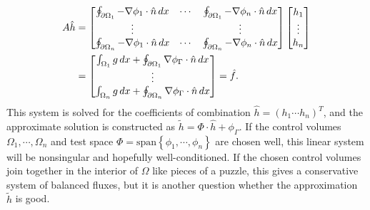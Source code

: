 \newcommand{\integralentry}[2]{\oint_{\pom_{#1}}-\nabla\phi_{#2}\cdot\hat{n}\,dx}
\newcommand{\integralrhsentry}[1]{\int_{\om_{#1}}g\,dx + \oint_{\pom_{#1}}\nabla\phi_\Gamma\cdot\hat{n}\,dx}
\begin{equation}\label{poisson_matrix_equation}
\begin{split}
    A\hat{h}
    &= \begin{bmatrix}
            \integralentry{1}{1} & \cdots & \integralentry{1}{n} \\
            \vdots & & \vdots \\
            \integralentry{n}{1} & \cdots & \integralentry{n}{n}
    \end{bmatrix}
    \begin{bmatrix} h_1 \\ \vdots \\ h_n \end{bmatrix}
    \\
    &= \begin{bmatrix} \integralrhsentry{1} \\ \vdots \\ \integralrhsentry{n}  \end{bmatrix}
    = \hat{f}.
\end{split}
\end{equation}
This system is solved for the coefficients of combination $\hat{h} = (h_1 \cdots h_n)^T$, and the approximate
solution is constructed as $\tilde{h} = \Phi\cdot\hat{h} + \phi_\Gamma$.
If the control volumes $\Omega_1,\cdots,\Omega_n$ and test space $\Phi = \text{span}\left\{\phi_1,\cdots,\phi_n\right\}$
are chosen well, this linear system will be nonsingular and hopefully well-conditioned.
If the chosen control volumes join together in the interior of $\Omega$ like pieces of a puzzle, this gives a conservative system of balanced fluxes, but it is another question whether the approximation
$\tilde{h}$ is good.

